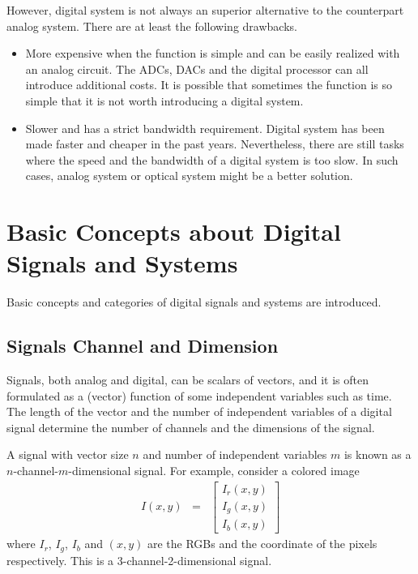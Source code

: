 However, digital system is not always an superior alternative to the counterpart analog system. There are at least the following drawbacks.
\begin{itemize}
	\item More expensive when the function is simple and can be easily realized with an analog circuit. The ADCs, DACs and the digital processor can all introduce additional costs. It is possible that sometimes the function is so simple that it is not worth introducing a digital system.
	\item Slower and has a strict bandwidth requirement. Digital system has been made faster and cheaper in the past years. Nevertheless, there are still tasks where the speed and the bandwidth of a digital system is too slow. In such cases, analog system or optical system might be a better solution.
\end{itemize}

\section{Basic Concepts about Digital Signals and Systems}

Basic concepts and categories of digital signals and systems are introduced.

\subsection{Signals Channel and Dimension}

Signals, both analog and digital, can be scalars of vectors, and it is often formulated as a (vector) function of some independent variables such as time. The length of the vector and the number of independent variables of a digital signal determine the number of channels and the dimensions of the signal.

A signal with vector size $n$ and number of independent variables $m$ is known as a $n$-channel-$m$-dimensional signal. For example, consider a colored image
\begin{eqnarray}
	I(x,y) &=& \left[\begin{array}{c}
		I_r(x,y) \\
		I_g(x,y) \\
		I_b(x,y)
	\end{array}\right] \nonumber
\end{eqnarray}
where $I_r$, $I_g$, $I_b$ and $(x,y)$ are the RGBs and the coordinate of the pixels respectively. This is a 3-channel-2-dimensional signal.

